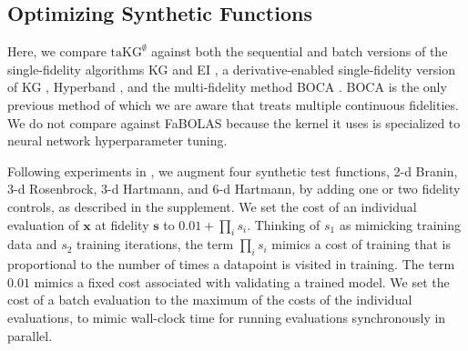 \documentclass[letterpaper]{article}
\newcommand{\cost}{c}
\newcommand{\x}{\mathbf{x}}
\newcommand{\s}{\mathbf{s}}
\newcommand{\taKGE}{\text{taKG}^\emptyset}
\numberwithin{equation}{section}
\begin{document}
\subsection{Optimizing Synthetic Functions} \label{sect:synthetic}
Here, we compare $\taKGE$ against both the sequential and batch versions of the single-fidelity algorithms KG \citep{wu2016parallel, wu2017knowledge} and EI \citep{jones1998efficient,wang2015parallel}, a derivative-enabled single-fidelity version of KG \citep{wu2017bayesian}, Hyperband \citep{li2016hyperband}, and the multi-fidelity method BOCA \citep{kandasamy2017multi}.  BOCA is the only previous method of which we are aware that treats multiple continuous fidelities.  We do not compare against FaBOLAS \citep{klein2016fast,klein2015towards} because the kernel it uses is specialized to neural network hyperparameter tuning.

Following experiments in \citet{kandasamy2017multi}, we augment four synthetic test functions, 2-d Branin, 3-d Rosenbrock, 3-d Hartmann, and 6-d Hartmann, by adding one or two fidelity controls, as described in the supplement.  
We set the cost of an individual evaluation of $\x$ at fidelity $\s$ to $0.01 + \prod_i s_i$.
Thinking of $s_1$ as mimicking training data and $s_2$ training iterations, 
the term $\prod_i s_i$ mimics a cost of training that is proportional to the number of times a datapoint is visited in training.  The term $0.01$ mimics a fixed cost associated with validating a trained model.
We set the cost of a batch evaluation to the maximum of the costs of the individual evaluations,
to mimic wall-clock time for running evaluations synchronously in parallel. 


\newcommand{\figwidth}{230pt}
\newcommand{\figheight}{160pt}
\end{document}
